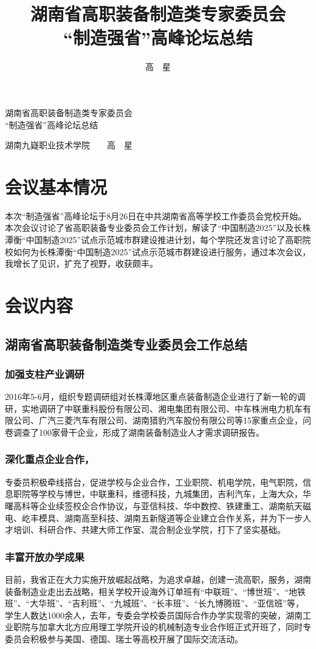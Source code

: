 \documentclass[UTF8,zihao=-4]{ctexart}
\title{湖南省高职装备制造类专家委员会\\“制造强省”高峰论坛总结}
\author{高~~星}
\date{}
\begin{document}
\begin{center}
 \heiti	湖南省高职装备制造类专家委员会\\“制造强省”高峰论坛总结

    湖南九嶷职业技术学院~~~~高~~星
\end{center}

\section{会议基本情况}
本次“制造强省”高峰论坛于8月26日在中共湖南省高等学校工作委员会党校开始。本次会议讨论了省高职装备专业委员会工作计划，解读了“中国制造2025”以及长株潭衡“中国制造2025”试点示范城市群建设推进计划，每个学院还发言讨论了高职院校如何为长株潭衡“中国制造2025”试点示范城市群建设进行服务，通过本次会议，我增长了见识，扩充了视野，收获颇丰。
\section{会议内容}
\subsection{湖南省高职装备制造类专业委员会工作总结}
\subsubsection{加强支柱产业调研}
2016年5-6月，组织专题调研组对长株潭地区重点装备制造企业进行了新一轮的调研，实地调研了中联重科股份有限公司、湘电集团有限公司、中车株洲电力机车有限公司、广汽三菱汽车有限公司、湖南猎豹汽车股份有限公司等15家重点企业，问卷调查了100家骨干企业，形成了湖南装备制造业人才需求调研报告。

\subsubsection{深化重点企业合作，}
专委员积极牵线搭台，促进学校与企业合作，工业职院、机电学院，电气职院，信息职院等学校与博世，中联重科，维德科技，九城集团，吉利汽车，上海大众，华曙高科等企业续签校企合作协议，与亚信科技、华中数控、铁建重工、湖南航天磁电、屹丰模具、湖南高至科技、湖南五新隧道等企业建立合作关系，并为下一步人才培训、科研合作、共建大师工作室、混合制企业学院，打下了坚实基础。

\subsubsection{丰富开放办学成果}
目前，我省正在大力实施开放崛起战略，为追求卓越，创建一流高职，服务，湖南装备制造业走出去战略，相关学校开设海外订单班有“中联班”、“博世班”、“地铁班”、“大华班”、“吉利班”、“九城班”、“长丰班”、“长九博腾班”、“亚信班”等，学生人数达1000余人，去年，专委会学校委员国际合作办学实现零的突破，湖南工业职院与加拿大北方应用理工学院开设的机械制造专业合作班正式开班了，同时专委员会积极参与美国、德国、瑞士等高校开展了国际交流活动。
\end{document}
